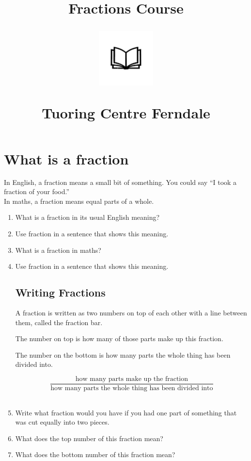 \documentclass[14pt]{article}
\title{Fractions Course\\
\begin{center}
\includegraphics[width=4em]{ApS_logo.png}
\end{center}
\begin{normalsize}Tuoring Centre Ferndale \end{normalsize}}
\author{}
\date{}
\begin{document}
\maketitle

\section{What is a fraction}

In English, a fraction means a small bit of something. You could say “I took a fraction of your food.”\\

In maths, a fraction means equal parts of a whole.\\

\begin{enumerate}

\item What is a fraction in its usual English meaning?
\item Use fraction in a sentence that shows this meaning.\\
\item What is a fraction in maths?
\item Use fraction in a sentence that shows this meaning.\\

\newpage

\subsection*{Writing Fractions}
A fraction is written as two numbers on top of each other with a line between them, called the fraction bar.

The number on top is how many of those parts make up this fraction.

The number on the bottom is how many parts the whole thing has been divided into.

$$\frac{\textrm{how many parts make up the fraction}}{\textrm{how many parts the whole thing has been divided into}}$$\\

\item Write what fraction would you have if you had one part of something that was cut equally into two pieces.
\item What does the top number of this fraction mean?
\item What does the bottom number of this fraction mean?\\


\end{enumerate}
\end{document}
